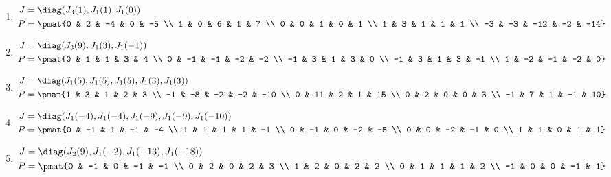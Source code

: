 \begin{enumerate}
\item

\begin{align*}
J &= \diag(J_{3}(1), J_{1}(1), J_{1}(0))\\
P &= \pmat{0 & 2 & -4 & 0 & -5 \\ 1 & 0 & 6 & 1 & 7 \\ 0 & 0 & 1 & 0 & 1 \\ 1 & 3 & 1 & 1 & 1 \\ -3 & -3 & -12 & -2 & -14}
\end{align*}

\item

\begin{align*}
J &= \diag(J_{3}(9), J_{1}(3), J_{1}(-1))\\
P &= \pmat{0 & 1 & 1 & 3 & 4 \\ 0 & -1 & -1 & -2 & -2 \\ -1 & 3 & 1 & 3 & 0 \\ -1 & 3 & 1 & 3 & -1 \\ 1 & -2 & -1 & -2 & 0}
\end{align*}

\item

\begin{align*}
J &= \diag(J_{1}(5), J_{1}(5), J_{1}(5), J_{1}(3), J_{1}(3))\\
P &= \pmat{1 & 3 & 1 & 2 & 3 \\ -1 & -8 & -2 & -2 & -10 \\ 0 & 11 & 2 & 1 & 15 \\ 0 & 2 & 0 & 0 & 3 \\ -1 & 7 & 1 & -1 & 10}
\end{align*}

\item

\begin{align*}
J &= \diag(J_{1}(-4), J_{1}(-4), J_{1}(-9), J_{1}(-9), J_{1}(-10))\\
P &= \pmat{0 & -1 & 1 & -1 & -4 \\ 1 & 1 & 1 & 1 & -1 \\ 0 & -1 & 0 & -2 & -5 \\ 0 & 0 & -2 & -1 & 0 \\ 1 & 1 & 0 & 1 & 1}
\end{align*}

\item

\begin{align*}
J &= \diag(J_{2}(9), J_{1}(-2), J_{1}(-13), J_{1}(-18))\\
P &= \pmat{0 & -1 & 0 & -1 & -1 \\ 0 & 2 & 0 & 2 & 3 \\ 1 & 2 & 0 & 2 & 2 \\ 0 & 1 & 1 & 1 & 2 \\ -1 & 0 & 0 & -1 & 1}
\end{align*}


\end{enumerate}
